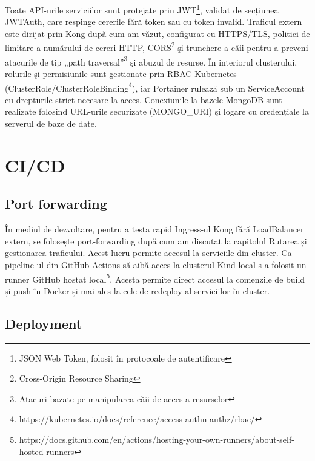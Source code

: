 Toate API-urile serviciilor sunt protejate prin JWT\footnote{JSON Web Token, folosit în protocoale de autentificare}, validat de
secțiunea JWTAuth, care
respinge cererile fără token sau cu token invalid. Traficul extern este dirijat prin Kong după cum am văzut,
configurat cu HTTPS/TLS, politici de limitare a numărului de cereri HTTP, CORS\footnote{Cross-Origin Resource Sharing}
şi trunchere a căii pentru a preveni
atacurile de tip „path traversal”\footnote{Atacuri bazate pe manipularea căii de acces a resurselor} şi abuzul de resurse.
În interiorul clusterului, rolurile
şi permisiunile sunt gestionate prin RBAC Kubernetes (ClusterRole/ClusterRoleBinding\footnote{https://kubernetes.io/docs/reference/access-authn-authz/rbac/}), iar
Portainer rulează sub un ServiceAccount cu drepturile strict necesare la acces. Conexiunile la bazele
MongoDB sunt realizate folosind URL-urile securizate (MONGO_URI) şi logare cu credențiale
la serverul de baze de date.

\section{CI/CD}

\subsection{Port forwarding}

În mediul de dezvoltare, pentru a testa rapid Ingress‐ul Kong fără LoadBalancer extern, se folosește port‐forwarding
după cum am discutat la capitolul Rutarea și gestionarea traficului. Acest lucru permite accesul la serviciile 
din cluster. Ca pipeline-ul din GitHub Actions să aibă acces la clusterul Kind local s-a folosit
un runner GitHub hostat 
local\footnote{https://docs.github.com/en/actions/hosting-your-own-runners/about-self-hosted-runners}.
Acesta permite direct accesul la comenzile de build și push în Docker și mai ales la cele de redeploy
al serviciilor în cluster.

\subsection{Deployment}

